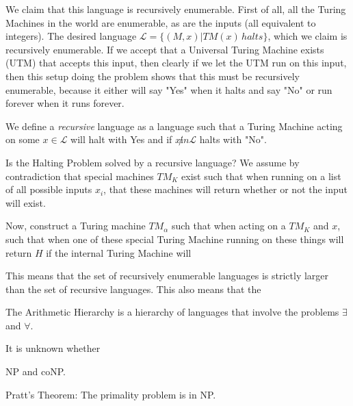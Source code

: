 \documentclass[11pt,twosided]{article}
\begin{document}
We claim that this language is recursively enumerable. First of all, all the Turing Machines in the world are enumerable, as are the inputs (all equivalent to integers). The desired language $\mathcal{L} = \{(M, x) | TM(x) \, halts \}$, which we claim is recursively enumerable. If we accept that a Universal Turing Machine exists (UTM) that accepts this input, then clearly if we let the UTM run on this input, then this setup doing the problem shows that this must be recursively enumerable, because it either will say "Yes" when it halts and say "No" or run forever when it runs forever. 

We define a \textit{recursive} language as a language such that a Turing Machine acting on some $x \in \mathcal{L}$ will halt with Yes and if $x \not in \mathcal{L}$ halts with "No". 

Is the Halting Problem solved by a recursive language? We assume by contradiction that special machines $TM_K$ exist such that when running on a list of all possible inputs $x_i$, that these machines will return whether or not the input will exist. 

Now, construct a Turing machine $TM_\alpha$ such that when acting on a $TM_K$ and $x$, such that when one of these special Turing Machine running on these things will return $H$ if the internal Turing Machine will 

This means that the set of recursively enumerable languages is strictly larger than the set of recursive languages. This also means that the 


The Arithmetic Hierarchy is a hierarchy of languages that involve the problems $\exists$ and $\forall$. 

It is unknown whether 





NP and coNP. 


Pratt's Theorem: The primality problem is in NP. 
\end{document}
